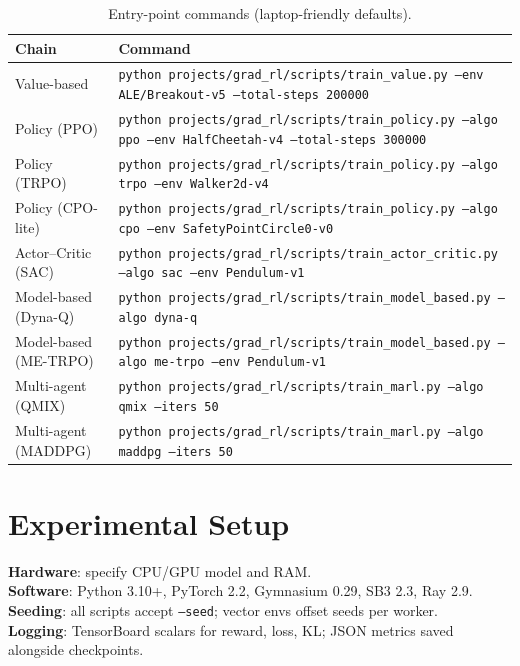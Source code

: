 \documentclass[11pt]{article}
\newcommand{\code}[1]{\texttt{#1}}
\begin{document}
\begin{table}[h]
    \centering
    \caption{Entry-point commands (laptop-friendly defaults).}
    \label{tab:commands}
    \begin{tabular}{ll}
        \toprule
        Chain & Command \\
        \midrule
        Value-based & \code{python projects/grad\_rl/scripts/train\_value.py --env ALE/Breakout-v5 --total-steps 200000} \\
        Policy (PPO) & \code{python projects/grad\_rl/scripts/train\_policy.py --algo ppo --env HalfCheetah-v4 --total-steps 300000} \\
        Policy (TRPO) & \code{python projects/grad\_rl/scripts/train\_policy.py --algo trpo --env Walker2d-v4} \\
        Policy (CPO-lite) & \code{python projects/grad\_rl/scripts/train\_policy.py --algo cpo --env SafetyPointCircle0-v0} \\
        Actor--Critic (SAC) & \code{python projects/grad\_rl/scripts/train\_actor\_critic.py --algo sac --env Pendulum-v1} \\
        Model-based (Dyna-Q) & \code{python projects/grad\_rl/scripts/train\_model\_based.py --algo dyna-q} \\
        Model-based (ME-TRPO) & \code{python projects/grad\_rl/scripts/train\_model\_based.py --algo me-trpo --env Pendulum-v1} \\
        Multi-agent (QMIX) & \code{python projects/grad\_rl/scripts/train\_marl.py --algo qmix --iters 50} \\
        Multi-agent (MADDPG) & \code{python projects/grad\_rl/scripts/train\_marl.py --algo maddpg --iters 50} \\
        \bottomrule
    \end{tabular}
\end{table}

\section{Experimental Setup}
\textbf{Hardware}: specify CPU/GPU model and RAM.\\
\textbf{Software}: Python 3.10+, PyTorch 2.2, Gymnasium 0.29, SB3 2.3, Ray 2.9.\\
\textbf{Seeding}: all scripts accept \code{--seed}; vector envs offset seeds per worker.\\
\textbf{Logging}: TensorBoard scalars for reward, loss, KL; JSON metrics saved alongside checkpoints.
\end{document}
